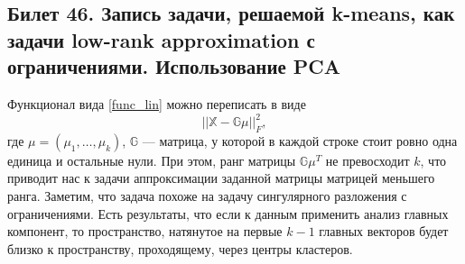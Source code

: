 \subsection{Билет 46. Запись задачи, решаемой k-means, как задачи low-rank approximation с	ограничениями. Использование PCA}
Функционал вида \eqref{func_lin} можно переписать в виде
\begin{equation}
||\mathbb{X} - \mathbb{G}\mu||^2_F, 
\end{equation}
где $\mu = (\mu_1, \ldots, \mu_k)$, $\mathbb{G}$ --- матрица, у которой в каждой строке стоит ровно одна единица и остальные нули.
При этом, ранг матрицы $\mathbb{G}\mu^T$ не превосходит $k$, что приводит нас к задачи аппроксимации заданной матрицы матрицей меньшего ранга.
Заметим, что задача похоже на задачу сингулярного разложения с ограничениями. 
Есть результаты, что если к данным применить анализ главных компонент, то пространство, натянутое на первые $k-1$ главных векторов будет близко к пространству, проходящему, через центры кластеров.